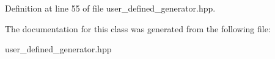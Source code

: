 Definition at line 55 of file user\-\_\-defined\-\_\-generator.\-hpp.



The documentation for this class was generated from the following file\-:\begin{DoxyCompactItemize}
\item 
user\-\_\-defined\-\_\-generator.\-hpp\end{DoxyCompactItemize}
